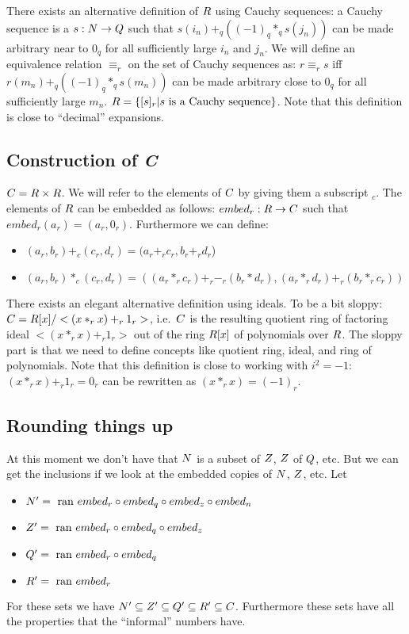 There exists an alternative definition of $R$ using Cauchy sequences: a
Cauchy sequence is a $s: N \rightarrow Q$ such that $s(i_n) +_q
\left((-1)_q *_q s(j_n)\right)$ can be made arbitrary near to $0_q$ for
all sufficiently large $i_n$ and $j_n$. We will define an equivalence
relation $\equiv_r$ on the set of Cauchy sequences as: $r \equiv_r s$
iff $r(m_n) +_q \left((-1)_q *_q s(m_n)\right)$ can be made arbitrary
close to $0_q$ for all sufficiently large $m_n$. $R = \{ [s]_r | s
\mbox{ is a Cauchy sequence}\}$.  Note that this definition is close to
``decimal'' expansions.

\subsection{Construction of \sl C}

$C = R \times R$. We will refer to the elements of $C$ by giving
them a subscript $_c$. The elements of $R$ can be embedded as follows:
$embed_r: R \rightarrow C$ such that $embed_r(a_r) = (a_r,0_r)$.
Furthermore we can define:
\begin{itemize}
\item $(a_r,b_r) +_c (c_r,d_r) = (a_r +_r c_r, b_r +_r d_r$)
\item $(a_r,b_r) *_c (c_r,d_r) = \left((a_r *_r c_r) +_r -_r (b_r * d_r),
      (a_r *_r d_r) +_r (b_r *_r c_r)\right)$
\end{itemize}

There exists an elegant alternative definition using ideals. To be a bit
sloppy: $C = R[x] / <(x *_r x) +_r 1_r>$, i.e.\ $C$ is the resulting
quotient ring of factoring ideal $<(x *_r x) +_r 1_r>$ out of the ring
$R[x]$ of polynomials over $R$. The sloppy part is that we need to
define concepts like quotient ring, ideal, and ring of polynomials. Note
that this definition is close to working with $i^2=-1$: $(x *_r x) +_r
1_r = 0_r$ can be rewritten as $(x *_r x) = (-1)_r$.

\subsection{Rounding things up}

At this moment we don't have that $N$ is a subset of $Z$, $Z$ of
$Q$, etc. But we can get the inclusions if we look at the embedded
copies of $N$, $Z$, etc. Let
\begin{itemize}
  \item $N' = \mbox{ ran } embed_r \circ embed_q \circ embed_z \circ embed_n$
  \item $Z' = \mbox{ ran } embed_r \circ embed_q \circ embed_z$
  \item $Q' = \mbox{ ran } embed_r \circ embed_q$
  \item $R' = \mbox{ ran } embed_r$
\end{itemize}
For these sets we have $N' \subseteq Z' \subseteq Q' \subseteq R'
\subseteq C$. Furthermore these sets have all the properties that the
``informal'' numbers have.


